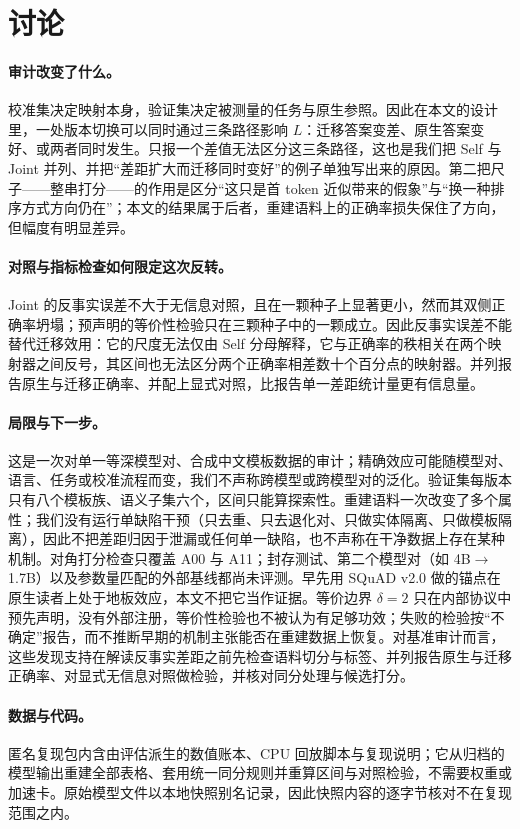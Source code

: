 \documentclass[11pt]{article}
\begin{document}
\section{讨论}

\paragraph{审计改变了什么。}
校准集决定映射本身，验证集决定被测量的任务与原生参照。因此在本文的设计里，一处版本切换可以同时通过三条路径影响 $L$：迁移答案变差、原生答案变好、或两者同时发生。只报一个差值无法区分这三条路径，这也是我们把 Self 与 Joint 并列、并把“差距扩大而迁移同时变好”的例子单独写出来的原因。第二把尺子——整串打分——的作用是区分“这只是首 token 近似带来的假象”与“换一种排序方式方向仍在”；本文的结果属于后者，重建语料上的正确率损失保住了方向，但幅度有明显差异。

\paragraph{对照与指标检查如何限定这次反转。}
Joint 的反事实误差不大于无信息对照，且在一颗种子上显著更小，然而其双侧正确率坍塌；预声明的等价性检验只在三颗种子中的一颗成立。因此反事实误差不能替代迁移效用：它的尺度无法仅由 Self 分母解释，它与正确率的秩相关在两个映射器之间反号，其区间也无法区分两个正确率相差数十个百分点的映射器。并列报告原生与迁移正确率、并配上显式对照，比报告单一差距统计量更有信息量。

\paragraph{局限与下一步。}
这是一次对单一等深模型对、合成中文模板数据的审计；精确效应可能随模型对、语言、任务或校准流程而变，我们不声称跨模型或跨模型对的泛化。验证集每版本只有八个模板族、语义子集六个，区间只能算探索性。重建语料一次改变了多个属性；我们没有运行单缺陷干预（只去重、只去退化对、只做实体隔离、只做模板隔离），因此不把差距归因于泄漏或任何单一缺陷，也不声称在干净数据上存在某种机制。对角打分检查只覆盖 A00 与 A11；封存测试、第二个模型对（如 4B$\to$1.7B）以及参数量匹配的外部基线都尚未评测。早先用 SQuAD v2.0 \citep{squad18} 做的锚点在原生读者上处于地板效应，本文不把它当作证据。等价边界 $\delta=2$ 只在内部协议中预先声明，没有外部注册，等价性检验也不被认为有足够功效；失败的检验按“不确定”报告，而不推断早期的机制主张能否在重建数据上恢复。对基准审计而言，这些发现支持在解读反事实差距之前先检查语料切分与标签、并列报告原生与迁移正确率、对显式无信息对照做检验，并核对同分处理与候选打分。

\paragraph{数据与代码。}
匿名复现包内含由评估派生的数值账本、CPU 回放脚本与复现说明；它从归档的模型输出重建全部表格、套用统一同分规则并重算区间与对照检验，不需要权重或加速卡。原始模型文件以本地快照别名记录，因此快照内容的逐字节核对不在复现范围之内。
\end{document}
